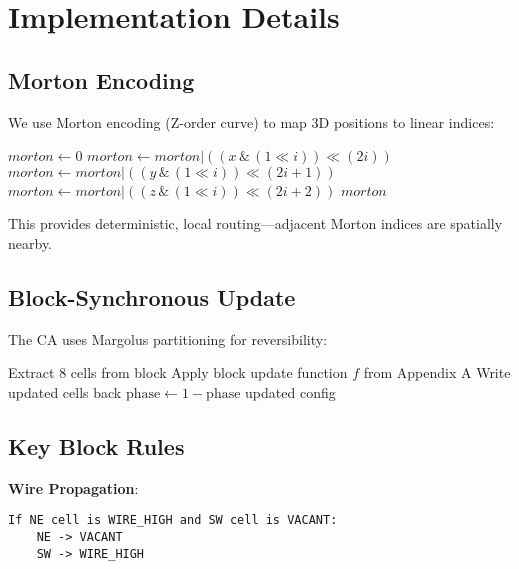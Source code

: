 \documentclass[11pt]{article}
\theoremstyle{plain}
\theoremstyle{definition}
\theoremstyle{remark}
\begin{document}
\section{Implementation Details}
\label{app:implementation}

\subsection{Morton Encoding}

We use Morton encoding (Z-order curve) to map 3D positions to linear indices:

\begin{algorithmic}[1]
\STATE $morton \gets 0$
    \STATE $morton \gets morton | ((x \,\&\, (1 \ll i)) \ll (2i))$
    \STATE $morton \gets morton | ((y \,\&\, (1 \ll i)) \ll (2i + 1))$
    \STATE $morton \gets morton | ((z \,\&\, (1 \ll i)) \ll (2i + 2))$
\ENDFOR
\RETURN $morton$
\ENDFUNCTION
\end{algorithmic}

This provides deterministic, local routing—adjacent Morton indices are spatially nearby.

\subsection{Block-Synchronous Update}

The CA uses Margolus partitioning for reversibility:

\begin{algorithmic}[1]
        \STATE Extract 8 cells from block
        \STATE Apply block update function $f$ from Appendix A
        \STATE Write updated cells back
    \ENDIF
\ENDFOR
\STATE $\text{phase} \gets 1 - \text{phase}$
\RETURN updated config
\ENDFUNCTION
\end{algorithmic}

\subsection{Key Block Rules}

\textbf{Wire Propagation}:
\begin{verbatim}
If NE cell is WIRE_HIGH and SW cell is VACANT:
    NE -> VACANT
    SW -> WIRE_HIGH
\end{verbatim}
\end{document}
